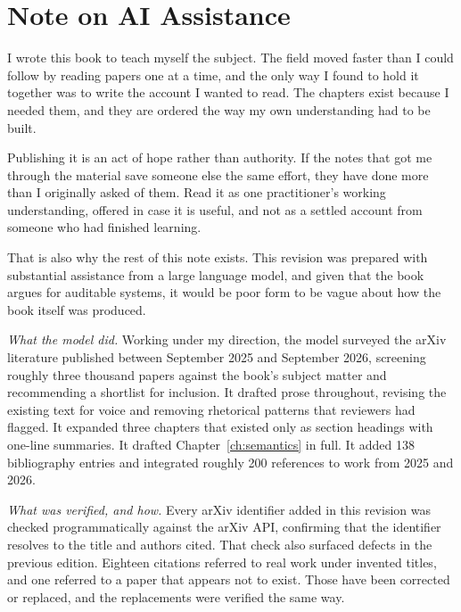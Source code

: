 \chapter*{Note on AI Assistance}

I wrote this book to teach myself the subject. The field moved faster than I
could follow by reading papers one at a time, and the only way I found to hold it
together was to write the account I wanted to read. The chapters exist because I
needed them, and they are ordered the way my own understanding had to be built.

Publishing it is an act of hope rather than authority. If the notes that got me
through the material save someone else the same effort, they have done more than
I originally asked of them. Read it as one practitioner's working understanding,
offered in case it is useful, and not as a settled account from someone who had
finished learning.

That is also why the rest of this note exists. This revision was prepared with
substantial assistance from a large language model, and given that the book argues
for auditable systems, it would be poor form to be vague about how the book itself
was produced.

\vspace{0.5em}
\noindent
\textit{What the model did.}
Working under my direction, the model surveyed the arXiv literature published
between September 2025 and September 2026, screening roughly three thousand
papers against the book's subject matter and recommending a shortlist for
inclusion. It drafted prose throughout, revising the existing text for voice and
removing rhetorical patterns that reviewers had flagged. It expanded three
chapters that existed only as section headings with one-line summaries. It
drafted Chapter~\ref{ch:semantics} in full. It added 138 bibliography entries and
integrated roughly 200 references to work from 2025 and 2026.

\vspace{0.5em}
\noindent
\textit{What was verified, and how.}
Every arXiv identifier added in this revision was checked programmatically
against the arXiv API, confirming that the identifier resolves to the title and
authors cited. That check also surfaced defects in the previous edition. Eighteen
citations referred to real work under invented titles, and one referred to a paper
that appears not to exist. Those have been corrected or replaced, and the
replacements were verified the same way.

